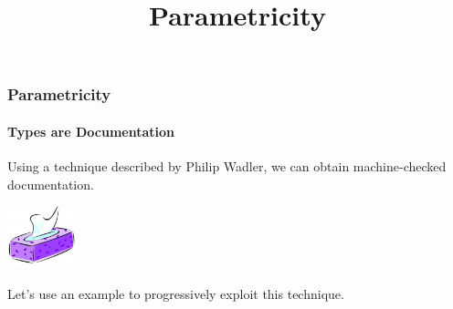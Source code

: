 {


  \begin{frame}[plain] 
  \title{Parametricity}
  
  \vspace{3em}

  \begin{TitleBoxParametricity}
    \begin{center}
    {\Large \inserttitle}
    \end{center}
  \end{TitleBoxParametricity}

  \end{frame}
}


\begin{frame}
\frametitle{Parametricity}
\framesubtitle{Types are Documentation}
\begin{center}
Using a technique described by Philip Wadler\cite{wadler1989theorems}, we can obtain machine-checked documentation.

\includegraphics[height=1.8cm]{image/tissues.jpg}

Let's use an example to progressively exploit this technique.
\end{center}
\end{frame}


